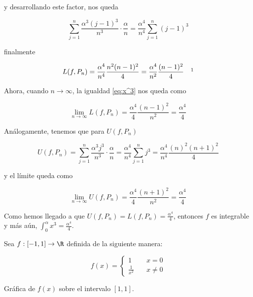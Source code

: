 \noindent y desarrollando este factor, nos queda

\[
\sum_{j=1}^n \frac{\alpha^3(j-1)^3}{n^3} \cdot \frac{\alpha}{n} = \frac{\alpha^4}{n^4} \sum_{j=1}^n (j-1)^3
\]

\noindent finalmente

\begin{equation}\label{eq:x^3}
L(f, P_n) = \frac{\alpha^4}{n^4} \frac{n^2(n-1)^2}{4} = \frac{\alpha^4}{n^2}\frac{(n-1)^2}{4} \quad \footnotemark
\end{equation}

Ahora, cuando $n \to \infty$, la igualdad \ref{eq:x^3}  nos queda como

\[
\lim_{n \to \infty} L(f,P_n) = \frac{\alpha^4}{4} \frac{(n-1)^2}{n^2} = \frac{\alpha^4}{4}
\]

Análogamente, tenemos que para $U(f, P_n)$

\[
U(f, P_n) = \sum_{j=1}^n \frac{\alpha^3 j^3}{n^3} \cdot \frac{\alpha}{n} = \frac{\alpha^4}{n^4} \sum_{j=1}^n j^3 = \frac{\alpha^4}{n^4}\frac{(n)^2(n+1)^2}{4}
\]

\noindent y el límite queda como

\[
\lim_{n \to \infty} U(f,P_n) = \frac{\alpha^4}{4} \frac{(n+1)^2}{n^2} = \frac{\alpha^4}{4}
\]

Como hemos llegado a que $U(f,P_n) = L(f,P_n) = \frac{\alpha^4}{4}$, entonces $f$ es integrable y más aún, $\int_0^{\alpha} x^3 = \frac{\alpha^4}{4}$.

\begin{ejem}
    Sea $f:[-1,1] \rightarrow \R$ definida de la siguiente manera:
    
    \[
    f(x) =
    \begin{cases}
    1 &\quad x = 0 \\
    \frac{1}{x^2} &\quad x\neq0
    \end{cases} 
    \]
\end{ejem}

\begin{marginfigure}
    \centering
    \caption{\footnotesize Gráfica de $f(x)$ sobre el intervalo $[1,1]$.}
    \label{fig:ej2}
\end{marginfigure}

